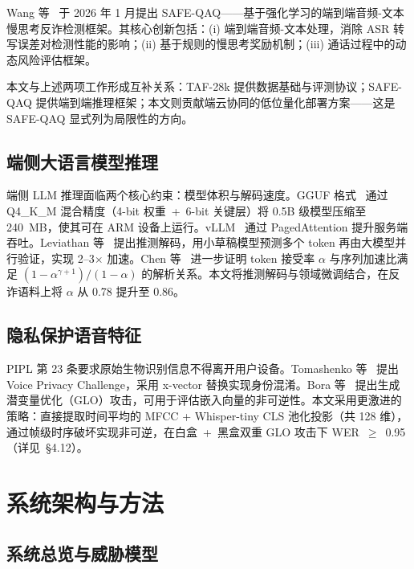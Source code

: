 \documentclass[UTF8,a4paper,10pt,twocolumn]{ctexart}
\theoremstyle{plain}
\begin{document}
Wang 等~\cite{wang2026safe} 于 2026 年 1 月提出 SAFE-QAQ——基于强化学习的端到端音频-文本慢思考反诈检测框架。其核心创新包括：(i) 端到端音频-文本处理，消除 ASR 转写误差对检测性能的影响；(ii) 基于规则的慢思考奖励机制；(iii) 通话过程中的动态风险评估框架。

本文与上述两项工作形成互补关系：TAF-28k 提供数据基础与评测协议；SAFE-QAQ 提供端到端推理框架；本文则贡献端云协同的低位量化部署方案——这是 SAFE-QAQ 显式列为局限性的方向。

\subsection{端侧大语言模型推理}

端侧 LLM 推理面临两个核心约束：模型体积与解码速度。GGUF 格式~\cite{gerganov2024gguf} 通过 Q4\_K\_M 混合精度（4-bit 权重~+~6-bit 关键层）将 0.5B 级模型压缩至 240~MB，使其可在 ARM 设备上运行。vLLM~\cite{kwon2023efficient} 通过 PagedAttention 提升服务端吞吐。Leviathan 等~\cite{leviathan2023fast} 提出推测解码，用小草稿模型预测多个 token 再由大模型并行验证，实现 2--3$\times$ 加速。Chen 等~\cite{chen2023accelerating} 进一步证明 token 接受率 $\alpha$ 与序列加速比满足 $(1-\alpha^{\gamma+1})/(1-\alpha)$ 的解析关系。本文将推测解码与领域微调结合，在反诈语料上将 $\alpha$ 从 0.78 提升至 0.86。

\subsection{隐私保护语音特征}

PIPL 第 23 条要求原始生物识别信息不得离开用户设备。Tomashenko 等~\cite{tomashenko2022voiceprivacy} 提出 Voice Privacy Challenge，采用 x-vector 替换实现身份混淆。Bora 等~\cite{bora2017compressed} 提出生成潜变量优化（GLO）攻击，可用于评估嵌入向量的非可逆性。本文采用更激进的策略：直接提取时间平均的 MFCC + Whisper-tiny CLS 池化投影（共 128 维），通过帧级时序破坏实现非可逆，在白盒~+~黑盒双重 GLO 攻击下 WER~$\geq$~0.95（详见~\S4.12）。

\section{系统架构与方法}

\subsection{系统总览与威胁模型}
\end{document}
